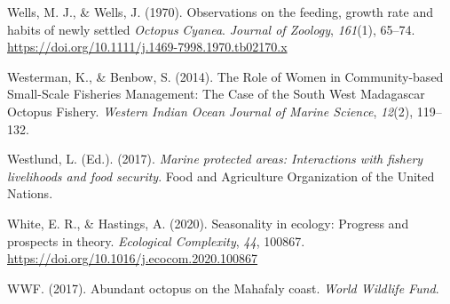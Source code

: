 \documentclass[
]{article}
\newlength{\cslhangindent}
\newlength{\cslentryspacingunit} %
\newenvironment{CSLReferences}[2] %
 {%
  \setlength{\parindent}{0pt}
  \ifodd #1
  \let\oldpar\par
  \def\par{\hangindent=\cslhangindent\oldpar}
  \fi
  \setlength{\parskip}{#2\cslentryspacingunit}
 }%
 {}
\begin{document}
\begin{CSLReferences}{1}{2}
\leavevmode{}%
Wells, M. J., \& Wells, J. (1970). Observations on the feeding, growth rate and habits of newly settled {\emph{Octopus}}{ \emph{Cyanea}}. \emph{Journal of Zoology}, \emph{161}(1), 65--74. \url{https://doi.org/10.1111/j.1469-7998.1970.tb02170.x}

\leavevmode{}%
Westerman, K., \& Benbow, S. (2014). The {Role} of {Women} in {Community-based Small-Scale Fisheries Management}: {The Case} of the {South West Madagascar Octopus Fishery}. \emph{Western Indian Ocean Journal of Marine Science}, \emph{12}(2), 119--132.

\leavevmode{}%
Westlund, L. (Ed.). (2017). \emph{Marine protected areas: Interactions with fishery livelihoods and food security}. {Food and Agriculture Organization of the United Nations}.

\leavevmode{}%
White, E. R., \& Hastings, A. (2020). Seasonality in ecology: {Progress} and prospects in theory. \emph{Ecological Complexity}, \emph{44}, 100867. \url{https://doi.org/10.1016/j.ecocom.2020.100867}

\leavevmode{}%
WWF. (2017). Abundant octopus on the {Mahafaly} coast. \emph{World Wildlife Fund}.

\end{CSLReferences}
\end{document}
